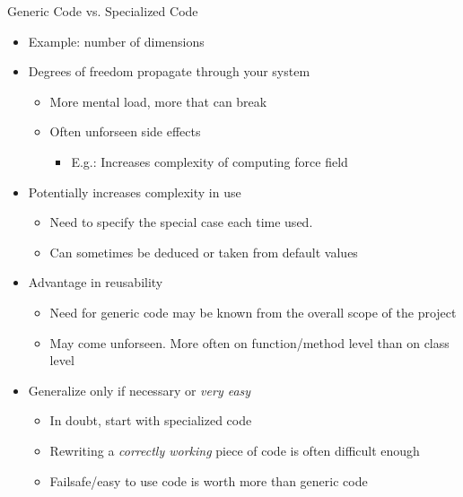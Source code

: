 \begin{frame}{Generic Code vs. Specialized Code}
%
\begin{itemize}
\item Example: number of dimensions
\item Degrees of freedom propagate through your system
	\begin{itemize}
	\item[\Thus] More mental load, more that can break
	\item Often unforseen side effects
		\begin{itemize}
		\item E.\;g.: Increases complexity of computing force field
		\end{itemize}
	\end{itemize}
\item Potentially increases complexity in use
	\begin{itemize}
	\item Need to specify the special case each time used. 
	\item Can sometimes be deduced or taken from default values
	\end{itemize}
\item Advantage in reusability
	\begin{itemize}
	\item Need for generic code may be known from the overall scope of the project
	\item May come unforseen. More often on function/method level than on class level
	\end{itemize}
\item[\Thus] Generalize only if necessary or \emph{very easy}
	\begin{itemize}
	\item In doubt, start with specialized code
	\item Rewriting a \emph{correctly working} piece of code is often difficult enough
	\item Failsafe/easy to use code is worth more than generic code
	\end{itemize}
\end{itemize}
%
\end{frame}


